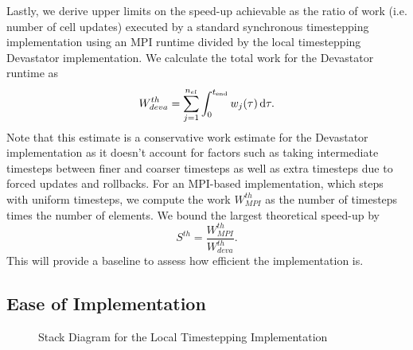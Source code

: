 Lastly, we derive upper limits on the speed-up achievable as the ratio of work (i.e. number of cell updates) executed by a standard synchronous timestepping implementation using an MPI runtime divided by the local timestepping Devastator implementation. We calculate the total work for the Devastator runtime as
\begin{equation*}
W^{th}_{deva} = \sum_{j=1}^{n_{el}} \int_0^{t_{\text{end}}} w_{j}(\tau) \, \mathrm{d} \tau.
\end{equation*}
Note that this estimate is a conservative work estimate for the Devastator implementation as it doesn't account for factors such as taking intermediate timesteps between finer and coarser timesteps as well as extra timesteps due to forced updates and rollbacks. For an MPI-based implementation, which steps with uniform timesteps, we compute the work $W^{th}_{MPI}$ as the number of timesteps times the number of elements.
We bound the largest theoretical speed-up by
\begin{equation*}
    S^{th} = \frac{ W^{th}_{MPI}}{W^{th}_{deva}}.
\end{equation*}
This will provide a baseline to assess how efficient the implementation is.

\subsection{Ease of Implementation}

\begin{figure}
    \centering
{}
\caption{Stack Diagram for the Local Timestepping Implementation}
\label{fig:stack-diagram}
\end{figure}


